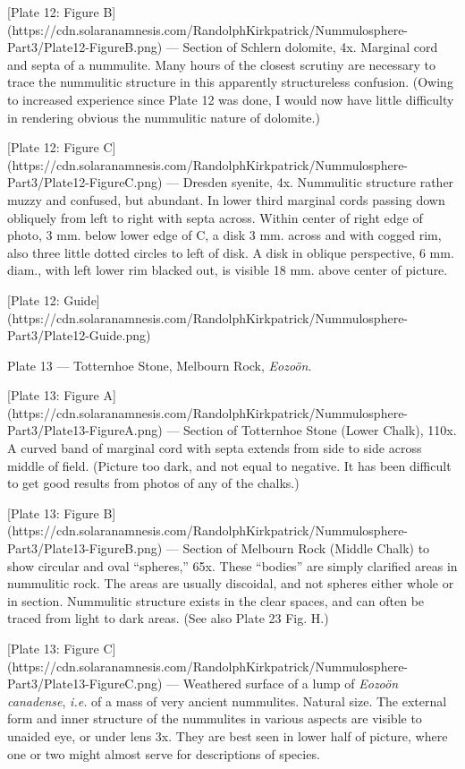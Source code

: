 \documentclass[a4paper, 12pt, oneside]{article}
\begin{document}
[Plate 12: Figure B](https://cdn.solaranamnesis.com/RandolphKirkpatrick/Nummulosphere-Part3/Plate12-FigureB.png) --- Section of Schlern dolomite, 4x. Marginal cord and septa of a nummulite. Many hours of the closest scrutiny are necessary to trace the nummulitic structure in this apparently structureless confusion. (Owing to increased experience since Plate 12 was done, I would now have little difficulty in rendering obvious the nummulitic nature of dolomite.)

[Plate 12: Figure C](https://cdn.solaranamnesis.com/RandolphKirkpatrick/Nummulosphere-Part3/Plate12-FigureC.png) --- Dresden syenite, 4x. Nummulitic structure rather muzzy and confused, but abundant. In lower third marginal cords passing down obliquely from left to right with septa across. Within center of right edge of photo, 3 mm. below lower edge of C, a disk 3 mm. across and with cogged rim, also three little dotted circles to left of disk. A disk in oblique perspective, 6 mm. diam., with left lower rim blacked out, is visible 18 mm. above center of picture.

[Plate 12: Guide](https://cdn.solaranamnesis.com/RandolphKirkpatrick/Nummulosphere-Part3/Plate12-Guide.png)

Plate 13 --- Totternhoe Stone, Melbourn Rock, \emph{Eozoön}.

[Plate 13: Figure A](https://cdn.solaranamnesis.com/RandolphKirkpatrick/Nummulosphere-Part3/Plate13-FigureA.png) --- Section of Totternhoe Stone (Lower Chalk), 110x. A curved band of marginal cord with septa extends from side to side across middle of field. (Picture too dark, and not equal to negative. It has been difficult to get good results from photos of any of the chalks.)

[Plate 13: Figure B](https://cdn.solaranamnesis.com/RandolphKirkpatrick/Nummulosphere-Part3/Plate13-FigureB.png) --- Section of Melbourn Rock (Middle Chalk) to show circular and oval ``spheres,'' 65x. These ``bodies'' are simply clarified areas in nummulitic rock. The areas are usually discoidal, and not spheres either whole or in section. Nummulitic structure exists in the clear spaces, and can often be traced from light to dark areas. (See also Plate 23 Fig. H.)

[Plate 13: Figure C](https://cdn.solaranamnesis.com/RandolphKirkpatrick/Nummulosphere-Part3/Plate13-FigureC.png) --- Weathered surface of a lump of \emph{Eozoön canadense}, \emph{i.e.} of a mass of very ancient nummulites. Natural size. The external form and inner structure of the nummulites in various aspects are visible to unaided eye, or under lens 3x. They are best seen in lower half of picture, where one or two might almost serve for descriptions of species.
\end{document}
